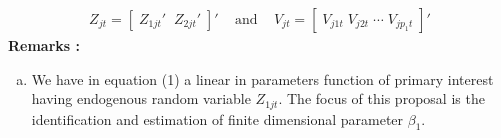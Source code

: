 \documentclass[10pt]{article}
\begin{document}
\begin{align*} 
Z_{jt} = [\; Z_{1jt}' \;\; Z_{2jt}' \;]'  \;\;\; \text{ and } \;\;\; V_{jt} = [ \; V_{j1t} \; V_{j2t} \; \cdots \;V_{jp_1t}\;]'
\end{align*}
%
\noindent \bf Remarks \rm: 
\begin{enumerate}[a.)] 
 \item We have in equation (1) a linear in parameters function of primary interest having endogenous random variable $Z_{1jt}$. The focus of this proposal is the identification and estimation of finite dimensional parameter $\beta_1$. 

\end{enumerate}
\end{document}
